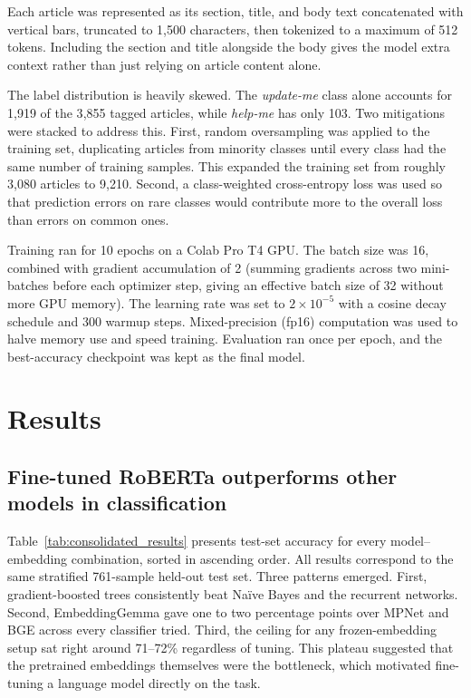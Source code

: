 \documentclass[11pt]{article}
\begin{document}
Each article was represented as its section, title, and body text concatenated with vertical bars, truncated to 1{,}500 characters, then tokenized to a maximum of 512 tokens. Including the section and title alongside the body gives the model extra context rather than just relying on article content alone.

The label distribution is heavily skewed. The \textit{update-me} class alone accounts for 1{,}919 of the 3{,}855 tagged articles, while \textit{help-me} has only 103. Two mitigations were stacked to address this. First, random oversampling was applied to the training set, duplicating articles from minority classes until every class had the same number of training samples. This expanded the training set from roughly 3{,}080 articles to 9{,}210. Second, a class-weighted cross-entropy loss was used so that prediction errors on rare classes would contribute more to the overall loss than errors on common ones.

Training ran for 10 epochs on a Colab Pro T4 GPU. The batch size was 16, combined with gradient accumulation of 2 (summing gradients across two mini-batches before each optimizer step, giving an effective batch size of 32 without more GPU memory). The learning rate was set to $2 \times 10^{-5}$ with a cosine decay schedule and 300 warmup steps. Mixed-precision (fp16) computation was used to halve memory use and speed training. Evaluation ran once per epoch, and the best-accuracy checkpoint was kept as the final model.

\section{Results}
\subsection{Fine-tuned RoBERTa outperforms other models in classification}


Table~\ref{tab:consolidated_results} presents test-set accuracy for every model--embedding combination, sorted in ascending order. All results correspond to the same stratified 761-sample held-out test set. Three patterns emerged. First, gradient-boosted trees consistently beat Naïve Bayes and the recurrent networks. Second, EmbeddingGemma gave one to two percentage points over MPNet and BGE across every classifier tried. Third, the ceiling for any frozen-embedding setup sat right around 71--72\% regardless of tuning. This plateau suggested that the pretrained embeddings themselves were the bottleneck, which motivated fine-tuning a language model directly on the task.
 
\end{document}
